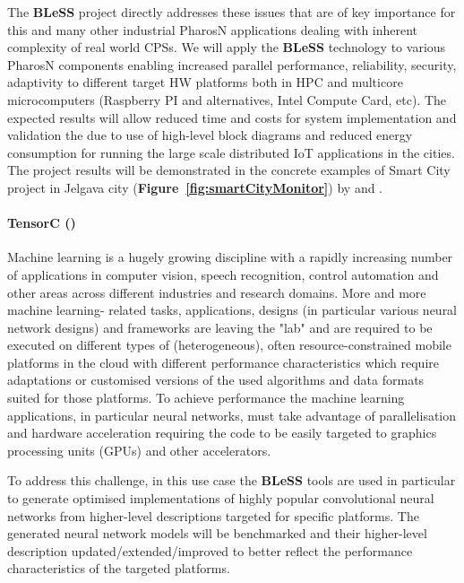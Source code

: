 \documentclass[a4paper,11pt]{article}
\newcommand{\project}[1]{\textbf{#1}\xspace}
\newcommand{\BLESS}{\project{BLeSS}}
\newcommand{\TheProject}{\BLESS}
\begin{document}
The \TheProject project directly addresses these issues that are of key importance for this and many other industrial PharosN applications dealing with inherent complexity of real world CPSs. We will apply the \TheProject technology to various PharosN components enabling increased parallel performance, reliability, security, adaptivity to different target HW platforms both in HPC and multicore microcomputers (Raspberry PI and alternatives, Intel Compute Card, etc). The expected results will allow reduced time and costs for system implementation and validation the due to use of high-level block diagrams and reduced energy consumption for running the large scale distributed IoT applications in the cities. The project results will be demonstrated in the concrete examples of Smart City project in Jelgava city (\textbf{Figure~\ref{fig:smartCityMonitor}}) by \JMOICshort{} and \GOLEMshort{}.
\paragraph{TensorC (\CODEPLAY)} Machine learning is a hugely growing discipline with a rapidly increasing number of applications in computer vision, speech recognition, control automation and other areas across different industries and research domains. More and more machine learning- related tasks, applications, designs (in particular various neural network designs) and frameworks are leaving the "lab" and are required to be executed on different types of (heterogeneous), often resource-constrained mobile platforms in the cloud with different performance characteristics which require adaptations or customised versions of the used algorithms and data formats suited for those platforms. To achieve performance the machine learning applications, in particular neural networks, must take advantage of parallelisation and hardware acceleration requiring the code to be easily targeted to graphics processing units (GPUs) and other accelerators.

To address this challenge, in this use case the \TheProject{} tools are used in particular to generate optimised implementations of highly popular convolutional neural networks from higher-level descriptions targeted for specific platforms. The generated neural network models will be benchmarked and their higher-level description updated/extended/improved to better reflect the performance characteristics of the targeted platforms.
\end{document}
